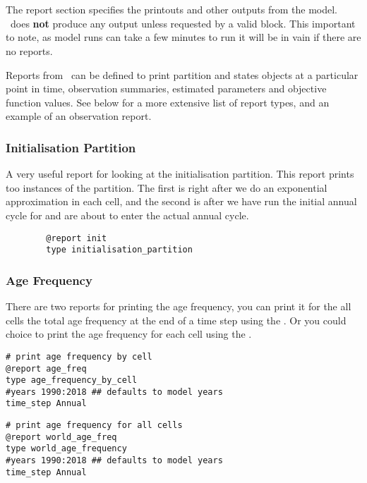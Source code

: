 \section{\label{sec:report-section}}
The report section specifies the printouts and other outputs from the model. \IBM\ does \textbf{not} produce any output unless requested by a valid  block. This important to note, as model runs can take a few minutes to run it will be in vain if there are no reports.

Reports from \IBM\ can be defined to print partition and states objects at a particular point in time, observation summaries, estimated parameters and objective function values. See below for a more extensive list of report types, and an example of an observation report.


\subsubsection{Initialisation Partition}
A very useful report for looking at the initialisation partition. This report prints too instances of the partition. The first is right after we do an exponential approximation in each cell, and the second is after we have run the initial annual cycle for  and are about to enter the actual annual cycle.

{\small{\begin{verbatim}
		@report init
		type initialisation_partition
\end{verbatim}}}


\subsubsection{Age Frequency}
There are two reports for printing the age frequency, you can print it for the all cells the total age frequency at the end of a time step using the  . Or you could choice to print the age frequency for each cell using the  . 
{\small{\begin{verbatim}
# print age frequency by cell
@report age_freq
type age_frequency_by_cell
#years 1990:2018 ## defaults to model years
time_step Annual
\end{verbatim}}}

{\small{\begin{verbatim}
# print age frequency for all cells
@report world_age_freq
type world_age_frequency
#years 1990:2018 ## defaults to model years
time_step Annual
\end{verbatim}}}



